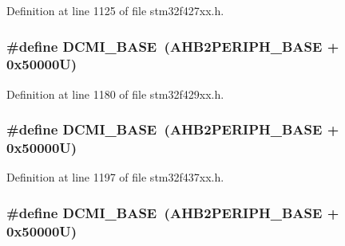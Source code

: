 Definition at line 1125 of file stm32f427xx.\+h.

\subsubsection[{\texorpdfstring{D\+C\+M\+I\+\_\+\+B\+A\+SE}{DCMI_BASE}}]{\setlength{\rightskip}{0pt plus 5cm}\#define D\+C\+M\+I\+\_\+\+B\+A\+SE~({\bf A\+H\+B2\+P\+E\+R\+I\+P\+H\+\_\+\+B\+A\+SE} + 0x50000\+U)}\hypertarget{group___peripheral__memory__map_ga55b794507e021135486de57129a2505c}{}\label{group___peripheral__memory__map_ga55b794507e021135486de57129a2505c}


Definition at line 1180 of file stm32f429xx.\+h.

\subsubsection[{\texorpdfstring{D\+C\+M\+I\+\_\+\+B\+A\+SE}{DCMI_BASE}}]{\setlength{\rightskip}{0pt plus 5cm}\#define D\+C\+M\+I\+\_\+\+B\+A\+SE~({\bf A\+H\+B2\+P\+E\+R\+I\+P\+H\+\_\+\+B\+A\+SE} + 0x50000\+U)}\hypertarget{group___peripheral__memory__map_ga55b794507e021135486de57129a2505c}{}\label{group___peripheral__memory__map_ga55b794507e021135486de57129a2505c}


Definition at line 1197 of file stm32f437xx.\+h.

\subsubsection[{\texorpdfstring{D\+C\+M\+I\+\_\+\+B\+A\+SE}{DCMI_BASE}}]{\setlength{\rightskip}{0pt plus 5cm}\#define D\+C\+M\+I\+\_\+\+B\+A\+SE~({\bf A\+H\+B2\+P\+E\+R\+I\+P\+H\+\_\+\+B\+A\+SE} + 0x50000\+U)}\hypertarget{group___peripheral__memory__map_ga55b794507e021135486de57129a2505c}{}\label{group___peripheral__memory__map_ga55b794507e021135486de57129a2505c}


